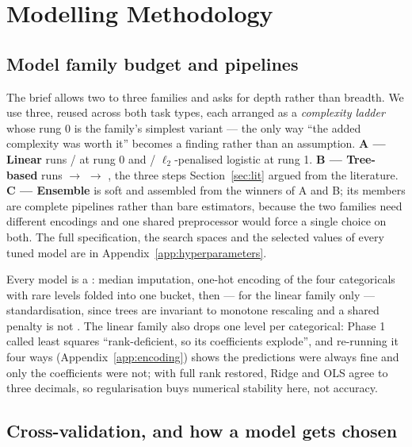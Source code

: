 \section{Modelling Methodology}
\label{sec:method}

\subsection{Model family budget and pipelines}
\label{sec:families}

The brief allows two to three families and asks for depth rather than breadth.
We use three, reused across both task types, each arranged as a
\emph{complexity ladder} whose rung 0 is the family's simplest variant --- the
only way ``the added complexity was worth it'' becomes a finding rather than an
assumption. \textbf{A --- Linear} runs  /
 at rung 0 and  / $\ell_2$-penalised
logistic at rung 1. \textbf{B --- Tree-based} runs  $\to$
 $\to$ , the three steps
Section~\ref{sec:lit} argued from the literature. \textbf{C --- Ensemble} is
soft  and  assembled from the winners of A and B;
its members are complete pipelines rather than bare estimators, because the two
families need different encodings and one shared preprocessor would force a
single choice on both. The full specification, the search spaces and the
selected values of every tuned model are in Appendix~\ref{app:hyperparameters}.

Every model is a  : median imputation, one-hot
encoding of the four categoricals with rare levels folded into one bucket, then
--- for the linear family only --- standardisation, since trees are invariant to
monotone rescaling and a shared penalty is not \citep{pedregosa2011sklearn}. The
linear family also drops one level per categorical: Phase 1 called least squares
``rank-deficient, so its coefficients explode'', and re-running it four ways
(Appendix~\ref{app:encoding}) shows the predictions were always fine and only the
coefficients were not; with full rank restored, Ridge and OLS agree to three
decimals, so regularisation buys numerical stability here, not accuracy.

\subsection{Cross-validation, and how a model gets chosen}
\label{sec:cv}

